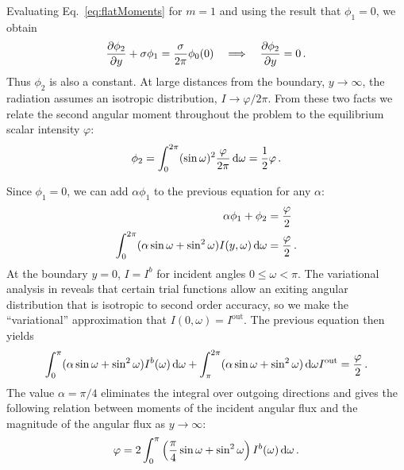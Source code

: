 Evaluating Eq.~\eqref{eq:flatMoments} for $m=1$ and using the result that
$\phi_{1}=0$, we obtain
\begin{equation*}
  \frac{\partial \phi_{2}}{\partial y}
  + \sigma \phi_{1}
  = \frac{\sigma}{2\pi} \phi_{0} (0)
  \quad \Longrightarrow \quad
  \frac{\partial \phi_{2}}{\partial y} = 0\,.
\end{equation*}
Thus $\phi_{2}$ is also a constant. At large distances from the boundary,
$y\to\infty$, the radiation assumes an isotropic distribution,
$I\to\varphi/2\pi$. From these two facts we relate the second angular moment
throughout the problem to the equilibrium scalar intensity $\varphi$:
\begin{equation*}
  \phi_{2} = \int_{0}^{2\pi} (\sin\omega)^2 \frac{\varphi}{2\pi} \mathop{}\!\mathrm{d}\omega
  = \frac{1}{2} \varphi\,.
\end{equation*}

Since $\phi_1=0$, we can add $\alpha \phi_1$ to the previous equation for any
$\alpha$:
\begin{align*}
 \alpha\phi_1 + \phi_{2} &= \frac{\varphi}{2} \\
 \int_{0}^{2\pi} (\alpha \sin\omega + \sin^2\omega)
 I(y,\omega) \mathop{}\!\mathrm{d}\omega
 &= \frac{\varphi}{2}\,.
\end{align*}
At the boundary $y=0$, $I=I^b$ for incident angles $0 \le \omega < \pi$.
The variational analysis in \cite{Mal1991} reveals that certain trial functions
allow an exiting angular distribution that is isotropic to second order accuracy,
so we make the ``variational'' approximation that $I(0,\omega)=I^\text{out}$.
The previous equation then yields
\begin{equation*}
 \int_{0}^{\pi} (\alpha \sin\omega + \sin^2\omega)
 I^b(\omega) \mathop{}\!\mathrm{d}\omega
 + \int_{\pi}^{2\pi} (\alpha \sin\omega + \sin^2\omega)\mathop{}\!\mathrm{d}\omega I^\text{out}
 = \frac{\varphi}{2}\,.
\end{equation*}
The value $\alpha=\pi/4$ eliminates the integral over outgoing directions and
gives the following relation between moments of the incident angular flux and the
magnitude of the angular flux as $y\to\infty$:
\begin{equation}\label{eq:varBoundary}
 \varphi = 2\int_{0}^{\pi} \left( \frac{\pi}{4} \sin\omega + \sin^2\omega \right)
 I^b(\omega) \mathop{}\!\mathrm{d}\omega
 \,.
\end{equation}

